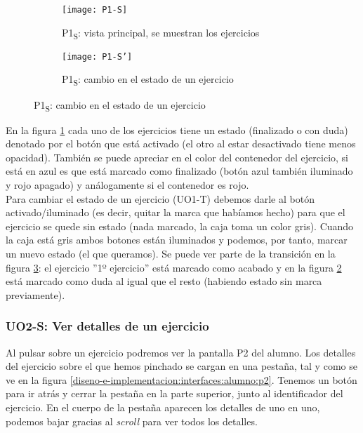 \noindent
\begin{figure}[!htbp]
\begin{subfigure}[t]{0.5\textwidth}
	\centering
	\texttt{[image: P1-S]}
	\caption{P1\textsubscript{S}: vista principal, se muestran los ejercicios}
	\label{fig:diseno-e-implementacion:interfaces:alumno:p1}
\end{subfigure}
%
\begin{subfigure}[t]{0.5\textwidth}
	\centering
	\texttt{[image: P1-S']}
	\caption{P1\textsubscript{S}: cambio en el estado de un ejercicio}
	\label{fig:diseno-e-implementacion:interfaces:alumno:p1'}
\end{subfigure}

\caption{P1\textsubscript{S}: cambio en el estado de un ejercicio}
\label{fig:p1-student}
\end{figure}

En la figura \ref{fig:diseno-e-implementacion:interfaces:alumno:p1} cada uno de los ejercicios tiene un estado (finalizado o con duda) denotado por el botón que está activado (el otro al estar desactivado tiene menos opacidad). También se puede apreciar en el color del contenedor del ejercicio, si está en azul es que está marcado como finalizado (botón azul también iluminado y rojo apagado) y análogamente si el contenedor es rojo.\\

Para cambiar el estado de un ejercicio (UO1-T) debemos darle al botón activado/iluminado (es decir, quitar la marca que habíamos hecho) para que el ejercicio se quede sin estado (nada marcado, la caja toma un color gris). Cuando la caja está gris ambos botones están iluminados y podemos, por tanto, marcar un nuevo estado (el que queramos). Se puede ver parte de la transición en la figura \ref{fig:p1-student}: el ejercicio ''1º ejercicio'' está marcado como acabado y en la figura \ref{fig:diseno-e-implementacion:interfaces:alumno:p1'} está marcado como duda al igual que el resto (habiendo estado sin marca previamente).\\

\subsubsection{UO2-S: Ver detalles de un ejercicio}
\label{diseno-e-implementacion:interfaces:alumno:uo2-s}

Al pulsar sobre un ejercicio podremos ver la pantalla P2 del alumno. Los detalles del ejercicio sobre el que hemos pinchado se cargan en una pestaña, tal y como se ve en la figura \ref{diseno-e-implementacion:interfaces:alumno:p2}. Tenemos un botón para ir atrás y cerrar la pestaña en la parte superior, junto al identificador del ejercicio. En el cuerpo de la pestaña aparecen los detalles de uno en uno, podemos bajar gracias al \textit{scroll} para ver todos los detalles.\\

